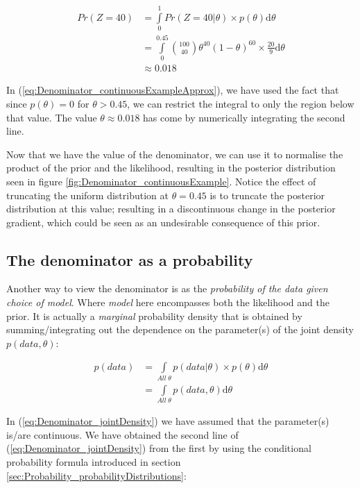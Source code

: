 \documentclass[11pt,fullpage]{book}
\begin{document}
\begin{align}\label{eq:Denominator_continuousExampleApprox}
Pr(Z=40) &= \int\limits_{0}^{1} Pr(Z=40|\theta) \times p(\theta) \mathrm{d}\theta\\
&= \int\limits_{0}^{0.45} {100 \choose 40} \theta^{40} (1-\theta)^{60} \times \frac{20}{9} \mathrm{d}\theta\\
&\approx 0.018
\end{align}

In (\ref{eq:Denominator_continuousExampleApprox}), we have used the fact that since $p(\theta)=0$ for $\theta>0.45$, we can restrict the integral to only the region below that value. The value $\theta\approx 0.018$ has come by numerically integrating the second line.

Now that we have the value of the denominator, we can use it to normalise the product of the prior and the likelihood, resulting in the posterior distribution seen in figure \ref{fig:Denominator_continuousExample}. Notice the effect of truncating the uniform distribution at $\theta=0.45$ is to truncate the posterior distribution at this value; resulting in a discontinuous change in the posterior gradient, which could be seen as an undesirable consequence of this prior.

\subsection{The denominator as a probability}\label{sec:Denominator_asAProbability}
Another way to view the denominator is as the \textit{probability of the data given choice of model}. Where \textit{model} here encompasses both the likelihood and the prior. It is actually a \textit{marginal} probability density that is obtained by summing/integrating out the dependence on the parameter(s) of the joint density $p(data,\theta)$:

\begin{align}\label{eq:Denominator_jointDensity}
p(data) &= \int\limits_{All\; \theta} p(data|\theta) \times p(\theta)\mathrm{d}\theta\\
& = \int\limits_{All\; \theta} p(data,\theta) \mathrm{d}\theta
\end{align}

In (\ref{eq:Denominator_jointDensity}) we have assumed that the parameter(s) is/are continuous. We have obtained the second line of (\ref{eq:Denominator_jointDensity}) from the first by using the conditional probability formula introduced in section \ref{sec:Probability_probabilityDistributions}:
\end{document}
